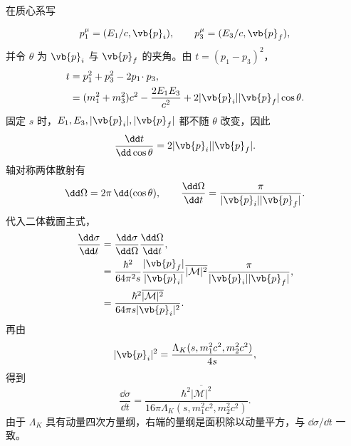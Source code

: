 \begin{derivation}[散射角与动量转移的变量变换]
在质心系写

\begin{equation*}
 p_1^\mu=(E_1/c,\vb{p}_i),
 \qquad
 p_3^\mu=(E_3/c,\vb{p}_f),
\end{equation*}
并令 $\theta$ 为 $\vb{p}_i$ 与 $\vb{p}_f$ 的夹角。由 $t=(p_1-p_3)^2$，
\begin{align*}
 t
 &=p_1^2+p_3^2-2p_1\!\cdot p_3,\\
 &=(m_1^2+m_3^2)c^2
 -\frac{2E_1E_3}{c^2}
 +2|\vb{p}_i||\vb{p}_f|\cos\theta.
 \end{align*}
固定 $s$ 时，$E_1,E_3,|\vb{p}_i|,|\vb{p}_f|$ 都不随 $\theta$ 改变，因此
\begin{equation*}
 \frac{\dd t}{\dd\cos\theta}
 =2|\vb{p}_i||\vb{p}_f|.
\end{equation*}
轴对称两体散射有
\begin{equation*}
 \dd\Omega=2\pi\,\dd(\cos\theta),
 \qquad
 \frac{\dd\Omega}{\dd t}
 =\frac{\pi}{|\vb{p}_i||\vb{p}_f|}.
\end{equation*}
代入二体截面主式，
\begin{align*}
 \frac{\dd\sigma}{\dd t}
 &=\frac{\dd\sigma}{\dd\Omega}
 \frac{\dd\Omega}{\dd t},\\
 &=\frac{\hbar^2}{64\pi^2s}
 \frac{|\vb{p}_f|}{|\vb{p}_i|}
 \overline{|\mathcal M|^2}
 \frac{\pi}{|\vb{p}_i||\vb{p}_f|},\\
 &=\frac{\hbar^2\overline{|\mathcal M|^2}}
 {64\pi s|\vb{p}_i|^2}.
\end{align*}
再由 
\begin{equation*}
 |\vb{p}_i|^2
 =\frac{\Lambda_K(s,m_1^2c^2,m_2^2c^2)}{4s},
\end{equation*}
得到
\begin{equation*}
 {
 \frac{\dd\sigma}{\dd t}
 =\frac{\hbar^2\overline{|\mathcal M|^2}}
 {16\pi\Lambda_K(s,m_1^2c^2,m_2^2c^2)}.}
 \end{equation*}
由于 $\Lambda_K$ 具有动量四次方量纲，右端的量纲是面积除以动量平方，与 $\dd\sigma/\dd t$ 一致。
\end{derivation}

